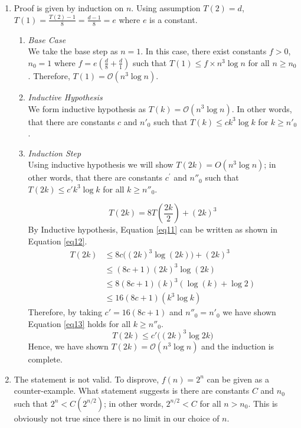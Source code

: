 \begin{enumerate}[label=(\alph*)]
\item Proof is given by induction on $n$. Using assumption $T(2) = d$, $T(1) = \frac{T(2)-1}{8} = \frac{d-1}{8} = e$ where $e$ is a constant.
\begin{enumerate}[label=\arabic*.]
\item \textit{Base Case}\\
We take the base step as $n = 1$.
In this case, there exist constants $f > 0$, $n_0 = 1$ where $f = e(\frac{d}{8}+\frac{d}{1})$ such that $T(1) \leq f \times n^3 \log n$ for all $n \geq n_0$. Therefore, $T(1) = \mathcal{O}(n^3 \log n)$.
\item \textit{Inductive Hypothesis}\\
We form inductive hypothesis as $T(k)=\mathcal{O}(n^3 \log n)$. In other words, that there are constants $c$ and $n'_0$ such that $T(k) \leq ck^3 \log k$ for $k \geq n'_0$.
\item \textit{Induction Step}\\
Using inductive hypothesis we will show $T(2k) = O(n^3\log n)$; in other words, that there are constants $c^\prime$ and $n''_0$ such that $T(2k) \leq c' k^3 \log k$ for all $k \geq n''_0$.

\begin{equation}\label{eq11}
T(2k) = 8 T(\frac{2k}{2}) + (2k)^3
\end{equation}
By Inductive hypothesis, Equation \ref{eq11} can be written as shown in Equation \ref{eq12}.
\begin{equation}\label{eq12}
\begin{aligned}
T(2k) &\leq 8c \big( (2k)^3 \log (2k) \big) + (2k)^3\\
&\leq (8c + 1) (2k)^3 \log (2k)\\
&\leq 8(8c+1) (k)^3 (\log (k) + \log 2)\\
&\leq 16(8c+1) (k^3 \log k)
\end{aligned}
\end{equation}
Therefore, by taking $c' = 16(8c+1)$ and $n''_0 = n'_0$ we have shown Equation \ref{eq13} holds for all $k \geq n''_0$.
\begin{equation}\label{eq13}
T(2k) \leq c' \big( (2k)^3 \log 2k \big)
\end{equation}
Hence, we have shown $T(2k) = \mathcal{O}(n^3\log n)$ and the induction is complete.
\end{enumerate}
\item The statement is not valid. To disprove, $f(n)=2^n$ can be given as a counter-example. What statement suggests is there are constants $C$ and $n_0$ such that $2^n < C(2^{n/2})$; in other words, $2^{n/2} < C$ for all $n > n_0$. This is obviously not true since there is no limit in our choice of $n$.
\end{enumerate}
